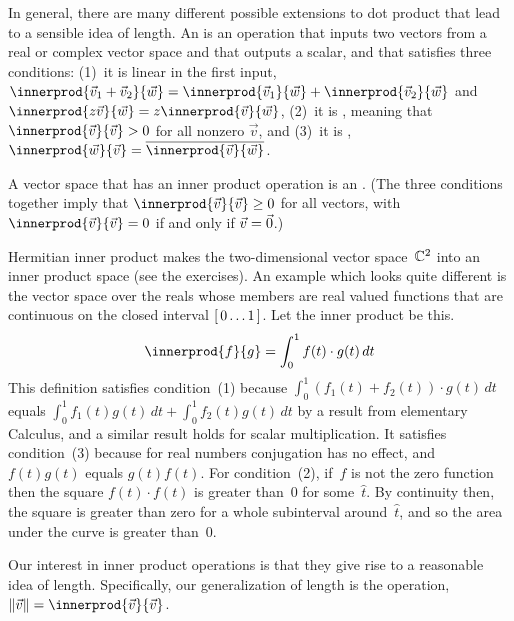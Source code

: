In general, there are many different possible extensions to dot product
that lead to a sensible idea of length.
An  is an operation
that inputs two vectors from a real or complex vector space 
and that outputs a scalar, and that satisfies 
three conditions:
(1)~it is linear in the first input,
$\innerprod{\vec{v}_1+\vec{v}_2}{\vec{w}}
 = \innerprod{\vec{v}_1}{\vec{w}}
   +\innerprod{\vec{v}_2}{\vec{w}}$
and $\innerprod{z\vec{v}}{\vec{w}}
     =z\innerprod{\vec{v}}{\vec{w}}$,
(2)~it is , meaning that
$\innerprod{\vec{v}}{\vec{v}}> 0$ for all nonzero $\vec{v}$,
and (3)~it is , 
$\innerprod{\vec{w}}{\vec{v}}=\compconj{\innerprod{\vec{v}}{\vec{w}}}$.

A vector space that has an inner product operation is an
.
(The three conditions together imply
that $\innerprod{\vec{v}}{\vec{v}}\geq 0$ for all vectors,
with $\innerprod{\vec{v}}{\vec{v}}=0$ if and only if $\vec{v}=\vec{0}$.)

Hermitian inner product makes the two-dimensional vector space~$\mathbb{C}^2$ into 
an inner product space (see the exercises).
An example which looks quite different 
is the vector space over the reals whose members are
real valued functions that are continuous on the 
closed interval $[\,0\ldots 1\,]$.
Let the inner product be this.
\begin{equation*}
  \innerprod{f}{g}=\int_{0}^1 f(t)\cdot g(t)\,dt
\end{equation*}
This definition satisfies
condition~(1) because  
$\int_{0}^1 (f_1(t)+f_2(t))\cdot g(t)\,dt$ equals 
$\int_{0}^1 f_1(t)g(t)\,dt+\int_{0}^1 f_2(t)g(t)\,dt$
by a result from elementary Calculus,
and a similar result holds for scalar multiplication. 
It satisfies condition~(3) because for real numbers conjugation has no effect,
and $f(t)g(t)$ equals $g(t)f(t)$. 
For condition~(2), if~$f$ is not the zero function then 
the square $f(t)\cdot f(t)$ is greater than~$0$ for some~$\hat{t}$.
By continuity then, the square is greater than zero for a whole subinterval
around~$\hat{t}$,
and so the area under the curve is greater than~$0$.

Our interest in inner product operations
is that they give rise to a reasonable idea of length.
Specifically, our generalization of length is the 
 operation, 
$\norm{\vec{v}}=\innerprod{\vec{v}}{\vec{v}}$.

